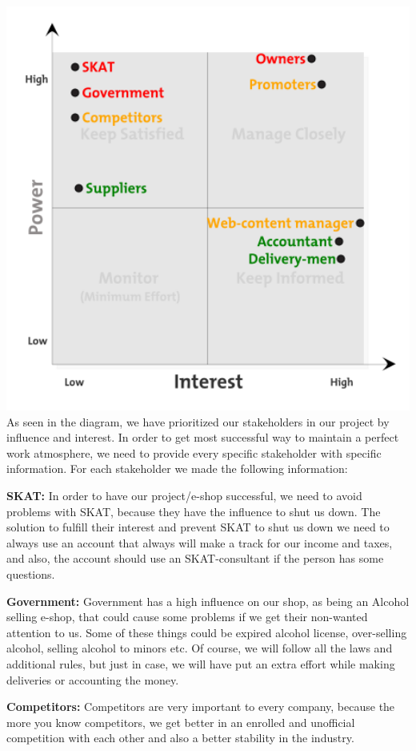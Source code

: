 \documentclass[12p]{article}
\begin{document}
\includegraphics[width=1\textwidth]{pics/stakeholder.png}\\
As seen in the diagram, we have prioritized our stakeholders in our project by influence and interest. In order to get most successful way to maintain a perfect work atmosphere, we need to provide every specific stakeholder with specific information. For each stakeholder we made the following information: 

\textbf{SKAT:}
In order to have our project/e-shop successful, we need to avoid problems with SKAT, because they have the influence to shut us down. The solution to fulfill their interest and prevent SKAT to shut us down we need to always use an account that always will make a track for our income and taxes, and also, the account should use an SKAT-consultant if the person has some questions.

\textbf{Government:}
Government has a high influence on our shop, as being an Alcohol selling e-shop, that could cause some problems if we get their non-wanted attention to us. Some of these things could be expired alcohol license, over-selling alcohol, selling alcohol to minors etc. Of course, we will follow all the laws and additional rules, but just in case, we will have put an extra effort while making deliveries or accounting the money.

\textbf{Competitors:}
Competitors are very important to every company, because the more you know competitors, we get better in an enrolled and unofficial competition with each other and also a better stability in the industry.
\end{document}
